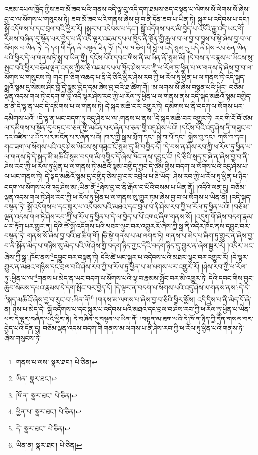 འཇམ་དཔལ་ཁྱོད་ཀྱིས་ཟབ་མོ་ཟབ་པའི་གནས་འདི་ལྟ་བུ་འདི་དག་ཐམས་ཅད་བསྟན་པ་ལེགས་སོ་ལེགས་སོ་ཞེས་བྱ་བ་ལ་སོགས་པ་གསུངས་ཏེ། ཟབ་མོ་ཟབ་པའི་གནས་ཞེས་བྱ་བ་ནི་དོན་ཟབ་པ་ཡིན་ཏེ། སྐུར་པ་འདེབས་པ་དང་། སྒྲོ་འདོགས་པ་དང་བྲལ་བའི་ཕྱིར་རོ། །སྐུར་པ་འདེབས་པ་དང་། སྒྲོ་འདོགས་པར་མི་བྱེད་པ་འདིའི་རྒྱུ་འདི་ཡང་གོ་རིམས་བཞིན་དུ་སྟོན་པར་བྱེད་པ་ནི་འདི་ལྟར་འཇམ་དཔལ་ཁྱོད་ནི་སྔོན་གྱི་རྒྱལ་བ་ལ་བྱ་བ་བྱས་པ་སྟེ་ཞེས་བྱ་བ་ལ་སོགས་པ་ཡིན་ཏེ། དེ་དག་གི་དོན་ནི་བསྟན་ཟིན་ཏོ། །དེ་ལ་ཁ་ཅིག་གི་བློ་ལ་འདི་སྙམ་དུ་འདི་ནི་ཤེས་རབ་ཅན་ཡིན་པའི་ཕྱིར་དེ་ལ་གནས་ཏེ་སྨྲ་བ་ཡིན་གྱི། དངོས་པོའི་དབང་གིས་ནི་མ་ཡིན་ནོ་སྙམ་མོ། །དེ་བས་ན་བརྙས་པ་ཡོངས་སུ་སྤང་བའི་ཕྱིར་བཅོམ་ལྡན་འདས་ཀྱིས་ཅི་འཇམ་དཔལ་ཁྱོད་ཤེས་རབ་ཀྱི་ཕ་རོལ་ཏུ་ཕྱིན་པ་ལ་གནས་ཏེ་ཞེས་བྱ་བ་ལ་སོགས་པ་གསུངས་ཏེ། གང་ཁ་ཅིག་འཆད་པ་ནི་དེ་ཅིའི་ཕྱིར་ཤེས་རབ་ཀྱི་ཕ་རོལ་ཏུ་ཕྱིན་པ་ལ་གནས་ཏེ་འདི་སྐད་སྨྲའོ་སྙམ་དུ་སེམས་ཤིང་བློ་དེ་སྙམ་བྱེད་དམ་ཞེས་བྱ་བའི་ཐ་ཚིག་གོ། །མ་ལགས་སོ་ཞེས་བསྟན་པའི་ཕྱིར། བཅོམ་ལྡན་འདས་གལ་ཏེ་བདག་གི་བློ་འདི་ལྟར་ཤེས་རབ་ཀྱི་ཕ་རོལ་ཏུ་ཕྱིན་པ་ལ་གནས་ནས་འདི་སྐད་མཆིའོ་སྙམ་བགྱིད་ན་ནི་དེ་ལྟ་ན་ཡང་དེ་དམིགས་པ་ལ་གནས་ཏེ། དེ་སྐད་མཆི་བར་འགྱུར་ཏེ། དམིགས་པ་ནི་བདག་ལ་སོགས་པར་དམིགས་པའོ། །དེ་ལྟ་ན་ཡང་བདག་ཏུ་འདུ་ཤེས་པ་ལ་:གནས་པ་ནས་\footnote{གནས་པ་ལས་  སྣར་ཐང་།  པེ་ཅིན། }དེ་སྐད་མཆི་བར་འགྱུར་ཏེ། རང་གི་ངོ་བོ་ཙམ་ལ་དམིགས་པ་སྔོན་དུ་བཏང་བ་ཅན་གྱི་མངོན་པར་ཞེན་པ་ཅན་གྱི་འདུ་ཤེས་པའོ། །དངོས་པོའི་འདུ་ཤེས་ནི་གཟུང་བ་དང་འཛིན་པ་ཡོད་པར་མངོན་པར་ཞེན་པའོ། །བར་གྱི་སྒྲས་སྲོག་དང་། སྐྱེ་བ་པོ་དང་། སྐྱེས་བུ་དང་། གསོ་བ་དང་། གང་ཟག་ལ་སོགས་པའི་འདུ་ཤེས་ཡོངས་སུ་གཟུང་ངོ་སྙམ་དུ་མི་བགྱིད་དོ། །དེ་བས་ན་ཤེས་རབ་ཀྱི་ཕ་རོལ་ཏུ་ཕྱིན་པ་ལ་གནས་ཏེ་དེ་སྐད་མི་མཆིའོ་སྙམ་བདག་མི་བགྱིད་དོ་ཞེས་ཁོང་ནས་དབྱུང་ངོ། །དེ་ཅིའི་སླད་དུ་ཞེ་ན་ཞེས་བྱ་བ་ནི་ཤེས་རབ་ཀྱི་ཕ་རོལ་ཏུ་ཕྱིན་པ་ལ་གནས་ཏེ་མཆིའོ་སྙམ་བགྱིད་ཀྱང་དེ་ཙམ་གྱིས་བདག་ལ་སོགས་པའི་འདུ་ཤེས་པ་ལ་ཡང་གནས་ཏེ། དེ་སྐད་མཆིའོ་སྙམ་དུ་བགྱིད་ཅེས་བྱ་བར་འབྲེལ་པ་ཅི་ཡོད། ཤེས་རབ་ཀྱི་ཕ་རོལ་ཏུ་ཕྱིན་པ་ཉིད་བདག་ལ་སོགས་པའི་འདུ་ཤེས་མ་:ཡིན་ནོ་\footnote{ཡིན་  སྣར་ཐང་། }ཞེས་བྱ་བ་ནི་རྒོལ་བ་པོའི་བསམ་པ་ཡིན་ནོ། །འདིའི་ལན་དུ། བཅོམ་ལྡན་འདས་གལ་ཏེ་ཤེས་རབ་ཀྱི་ཕ་རོལ་ཏུ་ཕྱིན་པ་ལ་གནས་སུ་གྱུར་ཏམ་ཞེས་བྱ་བ་ལ་སོགས་པ་ཡིན་ནོ། །འདི་སྐད་བསྟན་ཏེ། སྒྲོ་འདོགས་པ་དང་སྐུར་པ་འདེབས་པའི་མཐའ་དང་བྲལ་བ་ནི་ཤེས་རབ་ཀྱི་ཕ་རོལ་ཏུ་ཕྱིན་པའོ། །བཅོམ་ལྡན་འདས་གལ་ཏེ་ཤེས་རབ་ཀྱི་ཕ་རོལ་ཏུ་ཕྱིན་པ་དེ་ལ་བྱེད་པ་པོ་འགའ་ཞིག་གནས་སོ། །འདུག་གོ་ཞེས་བདག་རྣམ་པར་རྟོག་པར་གྱུར་ན། དེའི་ཚེ་སྒྲོ་འདོགས་པའི་མཐར་ལྟུང་བར་འགྱུར་རོ་ཞེས་ཀྱི་སྒྲ་ནི་འདིར་ཁོང་ནས་དབྱུང་བར་བསྟན་ཏེ། གནས་སོ་ཞེས་བྱ་བའི་ཐ་ཚིག་གོ། །ཅི་སྟེ་གནས་པ་མ་ལགས་ཏེ། གནས་པ་མེད་པ་ཞིག་ཏུ་གྱུར་ན་ཞེས་བྱ་བ་ནི་སྐྱོན་མེད་པ་གཉིས་སུ་མེད་པའི་ཡེ་ཤེས་ཀྱི་བདག་ཉིད་ཀྱང་དེའི་བདག་ཉིད་དུ་གྱུར་ན་ཞེས་སྦྱར་རོ། །འདིར་ཡང་ཞེས་ཀྱི་སྒྲ་:ཁོང་ནས་\footnote{ཁོ་ན་  སྣར་ཐང་།  པེ་ཅིན། }དབྱུང་བར་བསྟན་ཏེ། དེའི་ཚེ་ཡང་སྐུར་པ་འདེབས་པའི་མཐར་ལྟུང་བར་འགྱུར་རོ། །དེ་ལྟར་གྱུར་ན་མཐའ་གཉིས་དང་བྲལ་བའི་ཤེས་རབ་ཀྱི་ཕ་རོལ་ཏུ་ཕྱིན་པ་མ་ལགས་པར་འགྱུར་རོ། །ཤེས་རབ་ཀྱི་ཕ་རོལ་ཏུ་:ཕྱིན་པ་ལ་\footnote{ཕྱིན་པ་  སྣར་ཐང་།  པེ་ཅིན། }གནས་པ་མེད་ན་ཡང་བདག་ལ་སོགས་པའི་ལྟ་བ་རྣམས་སྤོང་བར་མི་འགྱུར་ཏེ། དེའི་དབང་གིས་བྱང་ཆུབ་སེམས་དཔའ་རྣམས་དེ་དག་སྤོང་བར་བྱེད་དོ། །དེ་ལྟར་ན་བདག་ལ་སོགས་པའི་འདུ་ཤེས་ལ་གནས་ནས་:དེ་དེ་\footnote{དེ་  སྣར་ཐང་།  པེ་ཅིན། }སྐད་མཆིའོ་ཞེས་བྱ་བ་རུང་བ་:ཡིན་ནོ།\footnote{ཡིན་ན།  སྣར་ཐང་།  པེ་ཅིན། } །གནས་མ་ལགས་པ་ཞེས་བྱ་བ་ཅིའི་ཕྱིར་སྨོས། འདི་དྲིས་པ་ནི་མེད་དོ་ཞེ་ན། ཉེས་པ་མེད་དེ། སྒྲོ་འདོགས་པ་དང་སྐུར་པ་འདེབས་པའི་མཐའ་དང་བྲལ་བ་ཤེས་རབ་ཀྱི་ཕ་རོལ་ཏུ་ཕྱིན་པ་ཡིན་པར་དེ་ལྟར་བཞེད་པའི་ཕྱིར་ཏེ། དེ་བཞིན་དུ་བསྟན་པ་ཡིན་ནོ། །བསྟན་མ་ཐག་པའི་དེ་ཁོ་ན་ཉིད་ཀྱི་དོན་གསལ་བར་བྱེད་པའི་དོན་དུ། བཅོམ་ལྡན་འདས་བདག་གི་གནས་མ་ལགས་པ་ནི་ཤེས་རབ་ཀྱི་ཕ་རོལ་ཏུ་ཕྱིན་པའི་གནས་ཏེ་ཞེས་གསུངས་ཏེ། 